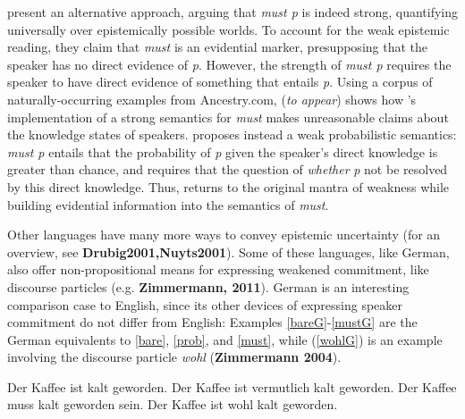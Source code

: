 \documentclass[11pt]{article}
\begin{document}
\cite{vonfintelgillies2010} present an alternative approach, arguing that \emph{must p} is indeed strong, quantifying universally over epistemically possible worlds. To account for the weak epistemic reading, they claim that \emph{must} is an evidential marker, presupposing that the speaker has no direct evidence of \emph{p}. However, the strength of \emph{must p} requires the speaker to have direct evidence of something that entails \emph{p}. Using a corpus of naturally-occurring examples from Ancestry.com, \citeauthor{lassiter2014salt} (\emph{to appear}) shows how \citeauthor{vonfintelgillies2010}'s implementation of a strong semantics for \emph{must} makes unreasonable claims about the knowledge states of speakers. \citeauthor{lassiter2014salt} proposes instead a weak probabilistic semantics: \emph{must p} entails that the probability of \emph{p} given the speaker's direct knowledge is greater than chance, and requires that the question of \emph{whether} \emph{p} not be resolved by this direct knowledge. Thus, \citeauthor{lassiter2014salt} returns to the original mantra of weakness while building evidential information into the semantics of \emph{must}.

Other languages have many more ways to convey epistemic uncertainty (for an overview, see \textbf{Drubig2001,Nuyts2001}). Some of these languages, like German, also offer non-propositional means for expressing weakened commitment, like discourse particles (e.g. \textbf{Zimmermann, 2011}). German is an interesting comparison case to English, since its other devices of expressing speaker commitment do not differ from English: Examples \ref{bareG}-\ref{mustG} are the German equivalents to \ref{bare}, \ref{prob}, and \ref{must}, while (\ref{wohlG}) is an example involving the discourse particle \emph{wohl} (\textbf{Zimmermann 2004}).

\begin{exe}
	\ex\label{german} \begin{xlist}
		\ex\label{bareG} Der Kaffee ist kalt geworden.
		\ex\label{probG} Der Kaffee ist vermutlich kalt geworden.
		\ex\label{mustG} Der Kaffee muss kalt geworden sein. 
		\ex\label{wohlG} Der Kaffee ist wohl kalt geworden.
	\end{xlist}
\end{exe}
\end{document}
